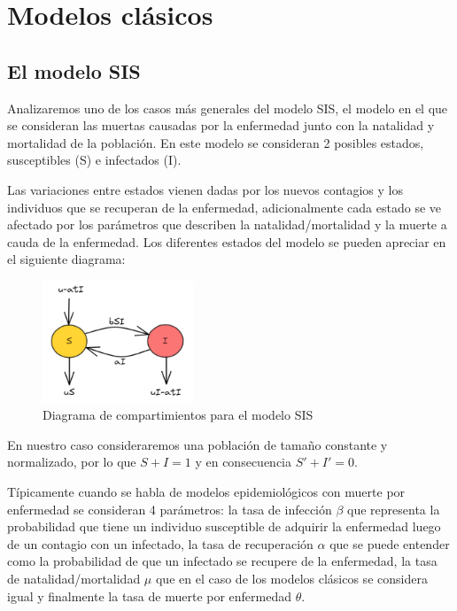 \chapter{Modelos clásicos}
\section{El modelo SIS}

Analizaremos uno de los casos más generales del modelo SIS, el modelo en el que se consideran las muertas causadas por la enfermedad junto con la natalidad y mortalidad de la población. En este modelo se consideran 2 posibles estados, susceptibles (S) e infectados (I).

Las variaciones entre estados vienen dadas por los nuevos contagios y los individuos que se recuperan de la enfermedad, adicionalmente cada estado se ve afectado por los parámetros que describen la natalidad/mortalidad y la muerte a cauda de la enfermedad. Los diferentes estados del modelo se pueden apreciar en el siguiente diagrama:

\begin{figure}[h]
  \centering
    \includegraphics[width=0.4\textwidth]{Imagenes/SIS_compartimientos.PNG}
  \caption{Diagrama de compartimientos para el modelo SIS}
  \label{fig:ClasicSIS}
\end{figure}

En nuestro caso consideraremos una población de tamaño constante y normalizado, por lo que $S + I = 1$ y en consecuencia $S' + I' = 0$.

Típicamente cuando se habla de modelos epidemiológicos con muerte por enfermedad se consideran 4 parámetros: la tasa de infección $\beta$ que representa la probabilidad que tiene un individuo susceptible de adquirir la enfermedad luego de un contagio con un infectado, la tasa de recuperación $\alpha$ que se puede entender como la probabilidad de que un infectado se recupere de la enfermedad, la tasa de natalidad/mortalidad $\mu$ que en el caso de los modelos clásicos se considera igual y finalmente la tasa de muerte por enfermedad $\theta$.

